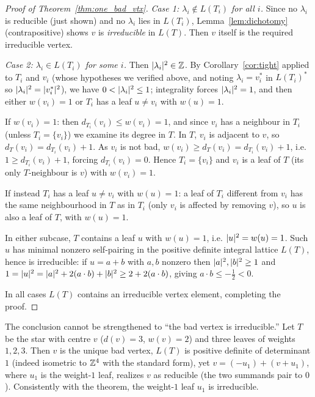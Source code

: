 \begin{proof}[Proof of Theorem~\ref{thm:one_bad_vtx}]
\emph{Case 1: $\lambda_i\notin L(T_i)$ for all $i$.}  Since no $\lambda_i$ is reducible (just
shown) and no $\lambda_i$ lies in $L(T_i)$, Lemma~\ref{lem:dichotomy} (contrapositive) shows
$v$ is \emph{irreducible} in $L(T)$.  Then $v$ itself is the required irreducible vertex.

\emph{Case 2: $\lambda_i\in L(T_i)$ for some $i$.}  Then $\lvert \lambda_i\rvert^{2}\in\mathbb{Z}$.  By
Corollary~\ref{cor:tight} applied to $T_i$ and $v_i$ (whose hypotheses we verified above, and
noting $\lambda_i=v_i^\ast$ in $L(T_i)^\ast$ so $\lvert \lambda_i\rvert^{2}=\lvert v_i^\ast\rvert^{2}$), we have
$0<\lvert \lambda_i\rvert^{2}\le1$; integrality forces $\lvert \lambda_i\rvert^{2}=1$, and then either
$w(v_i)=1$ or $T_i$ has a leaf $u\ne v_i$ with $w(u)=1$.

If $w(v_i)=1$: then $d_{T_i}(v_i)\le w(v_i)=1$, and since $v_i$ has a neighbour in $T_i$
(unless $T_i=\{v_i\}$) we examine its degree in $T$.  In $T$, $v_i$ is adjacent to $v$, so
$d_T(v_i)=d_{T_i}(v_i)+1$.  As $v_i$ is not bad, $w(v_i)\ge d_T(v_i)=d_{T_i}(v_i)+1$, i.e.
$1\ge d_{T_i}(v_i)+1$, forcing $d_{T_i}(v_i)=0$.  Hence $T_i=\{v_i\}$ and $v_i$ is a leaf of
$T$ (its only $T$-neighbour is $v$) with $w(v_i)=1$.

If instead $T_i$ has a leaf $u\ne v_i$ with $w(u)=1$: a leaf of $T_i$ different from $v_i$ has
the same neighbourhood in $T$ as in $T_i$ (only $v_i$ is affected by removing $v$), so $u$ is
also a leaf of $T$, with $w(u)=1$.

In either subcase, $T$ contains a leaf $u$ with $w(u)=1$, i.e. $\lvert u\rvert^{2}=w(u)=1$.  Such $u$ has
minimal nonzero self-pairing in the positive definite integral lattice $L(T)$, hence is
irreducible: if $u=a+b$ with $a,b$ nonzero then $\lvert a\rvert^{2},\lvert b\rvert^{2}\ge1$ and
$1=\lvert u\rvert^{2}=\lvert a\rvert^{2}+2(a\cdot b)+\lvert b\rvert^{2}\ge2+2(a\cdot b)$, giving $a\cdot b\le-\tfrac12<0$.

In all cases $L(T)$ contains an irreducible vertex element, completing the proof.
\end{proof}

\begin{rem}[Sharpness]
The conclusion cannot be strengthened to ``the bad vertex is irreducible.''  Let $T$ be the
star with centre $v$ ($d(v)=3$, $w(v)=2$) and three leaves of weights $1,2,3$.  Then $v$ is
the unique bad vertex, $L(T)$ is positive definite of determinant $1$ (indeed isometric to
$\mathbb{Z}^4$ with the standard form), yet $v=(-u_1)+(v+u_1)$, where $u_1$ is the weight-$1$ leaf,
realizes $v$ as reducible (the two summands pair to $0$).  Consistently with the theorem, the
weight-$1$ leaf $u_1$ is irreducible.
\end{rem}
